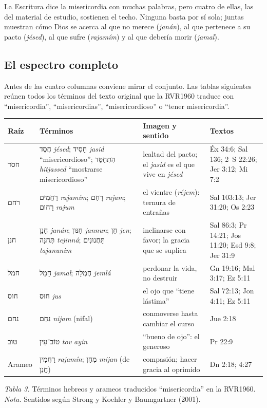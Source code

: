 \documentclass[11pt,letterpaper]{article}
\newcommand{\heb}[1]{\mbox{\foreignlanguage{hebrew}{#1}}}
\begin{document}
La Escritura dice la misericordia con muchas palabras, pero cuatro de ellas, las del material de estudio, sostienen el techo. Ninguna basta por sí sola; juntas muestran cómo Dios se acerca al que no merece (\emph{janán}), al que pertenece a su pacto (\emph{jésed}), al que sufre (\emph{rajamím}) y al que debería morir (\emph{jamal}).

\subsection{El espectro completo}\label{sec:espectro}
Antes de las cuatro columnas conviene mirar el conjunto. Las tablas siguientes reúnen todos los términos del texto original que la RVR1960 traduce con ``misericordia'', ``misericordias'', ``misericordioso'' o ``tener misericordia''.

\begin{center}\small\renewcommand{\arraystretch}{1.2}
\begin{tabular}{@{}L{1.3cm}L{4.6cm}L{4.4cm}L{4.0cm}@{}}
\toprule
\textbf{Raíz} & \textbf{Términos} & \textbf{Imagen y sentido} & \textbf{Textos} \\ \midrule
\heb{חסד} & \heb{חֶסֶד} \emph{jésed}; \heb{חָסִיד} \emph{jasid} ``misericordioso''; \heb{הִתְחַסֵּד} \emph{hitjassed} ``mostrarse misericordioso'' & lealtad del pacto; el \emph{jasid} es el que vive en \emph{jésed} & Éx 34:6; Sal 136; 2~S 22:26; Jer 3:12; Mi 7:2 \\
\heb{רחם} & \heb{רַחֲמִים} \emph{rajamím}; \heb{רָחַם} \emph{rajam}; \heb{רַחוּם} \emph{rajum} & el vientre (\emph{réjem}): ternura de entrañas & Sal 103:13; Jer 31:20; Os 2:23 \\
\heb{חנן} & \heb{חָנַן} \emph{janán}; \heb{חַנּוּן} \emph{jannun}; \heb{חֵן} \emph{jen}; \heb{תְּחִנָּה} \emph{tejinná}; \heb{תַּחֲנוּנִים} \emph{tajanunim} & inclinarse con favor; la gracia que se suplica & Sal 86:3; Pr 14:21; Jos 11:20; Esd 9:8; Jer 31:9 \\
\heb{חמל} & \heb{חָמַל} \emph{jamal}; \heb{חֶמְלָה} \emph{jemlá} & perdonar la vida, no destruir & Gn 19:16; Mal 3:17; Ez 5:11 \\
\heb{חוס} & \heb{חוּס} \emph{jus} & el ojo que ``tiene lástima'' & Sal 72:13; Jon 4:11; Ez 5:11 \\
\heb{נחם} & \heb{נִחַם} \emph{nijam} (nifal) & conmoverse hasta cambiar el curso & Jue 2:18 \\
\heb{טוב} & \heb{טוֹב־עַיִן} \emph{tov ayin} & ``bueno de ojo'': el generoso & Pr 22:9 \\
Arameo & \heb{רַחֲמִין} \emph{rajamín}; \heb{מִחַן} \emph{mijan} (de \heb{חֲנַן}) & compasión; hacer gracia al oprimido & Dn 2:18; 4:27 \\
\bottomrule
\end{tabular}\par
{\footnotesize\color{gris}\textit{Tabla 3.} Términos hebreos y arameos traducidos ``misericordia'' en la RVR1960. \textit{Nota.} Sentidos según Strong y Koehler y Baumgartner (2001).}
\end{center}
\end{document}
